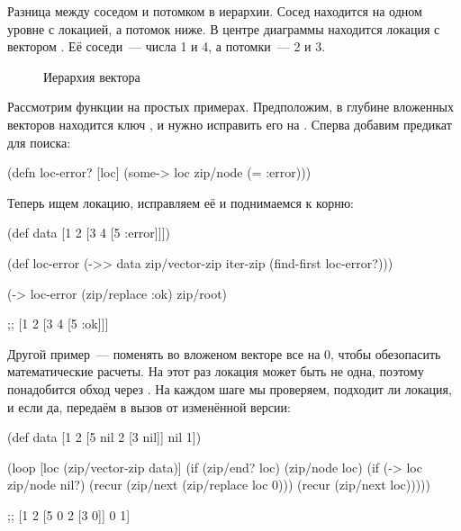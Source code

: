 Разница между соседом и потомком в иерархии. Сосед находится на одном уровне с
локацией, а потомок ниже. В центре диаграммы находится локация с вектором \code{[2
3]}. Её соседи~--- числа 1 и 4, а потомки~--- 2 и 3.

\begin{figure}[H]
  \centering
  
  \caption{Иерархия вектора}
  \label{fig:chart-zip-12}
\end{figure}

Рассмотрим функции на простых примерах. Предположим, в глубине вложенных
векторов находится ключ , и нужно исправить его на . Сперва добавим
предикат для поиска:

\begin{english}
  \begin{clojure}
(defn loc-error? [loc]
  (some-> loc zip/node (= :error)))
  \end{clojure}
\end{english}

Теперь ищем локацию, исправляем её и поднимаемся к корню:

\begin{english}
  \begin{clojure}
(def data [1 2 [3 4 [5 :error]]])

(def loc-error
  (->> data
       zip/vector-zip
       iter-zip
       (find-first loc-error?)))

(-> loc-error
    (zip/replace :ok)
    zip/root)

;; [1 2 [3 4 [5 :ok]]]
  \end{clojure}
\end{english}

Другой пример~--- поменять во вложеном векторе все  на 0, чтобы обезопасить
математические расчеты. На этот раз локация может быть не одна, поэтому
понадобится обход через . На каждом шаге мы проверяем, подходит ли
локация, и если да, передаём в  вызов  от изменённой версии:

\begin{english}
  \begin{clojure}
(def data [1 2 [5 nil 2 [3 nil]] nil 1])

(loop [loc (zip/vector-zip data)]
  (if (zip/end? loc)
    (zip/node loc)
    (if (-> loc zip/node nil?)
      (recur (zip/next (zip/replace loc 0)))
      (recur (zip/next loc)))))

;; [1 2 [5 0 2 [3 0]] 0 1]
  \end{clojure}
\end{english}


